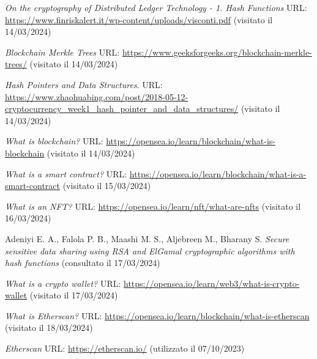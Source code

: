 \documentclass[12pt]{report}
\begin{document}
\begin{thebibliography}{unsrt}
    \textit{On the cryptography of Distributed Ledger Technology - 1. Hash Functions}\newline
    URL: \url{https://www.finriskalert.it/wp-content/uploads/visconti.pdf} (visitato il 14/03/2024)
    
    \textit{Blockchain Merkle Trees}\newline
    URL: \url{https://www.geeksforgeeks.org/blockchain-merkle-trees/}\newline
    (visitato il 14/03/2024)

    \textit{Hash Pointers and Data Structures}. URL: \url{https://www.zhaohuabing.com/post/2018-05-12-cryptocurrency_week1_hash_pointer_and_data_structures/} (visitato il 14/03/2024)

    \textit{What is blockchain?}\newline
    URL: \url{https://opensea.io/learn/blockchain/what-is-blockchain}\newline
    (visitato il 14/03/2024)

    \textit{What is a smart contract?} URL: \url{https://opensea.io/learn/blockchain/what-is-a-smart-contract} (visitato il 15/03/2024)

    \textit{What is an NFT?}\newline
    URL: \url{https://opensea.io/learn/nft/what-are-nfts}\newline
    (visitato il 16/03/2024)

    Adeniyi E. A., Falola P. B., Maashi M. S., Aljebreen M., Bharany S.\newline
    \textit{Secure sensitive data sharing using RSA and ElGamal cryptographic algorithms with hash functions} (consultato il 17/03/2024)

    \textit{What is a crypto wallet?}\newline
    URL: \url{https://opensea.io/learn/web3/what-is-crypto-wallet}\newline
    (visitato il 17/03/2024)

    \textit{What is Etherscan?}\newline
    URL: \url{https://opensea.io/learn/blockchain/what-is-etherscan}\newline
    (visitato il 18/03/2024)

    \textit{Etherscan}\newline
    URL: \url{https://etherscan.io/} (utilizzato il 07/10/2023)
    

\end{thebibliography}
\end{document}
